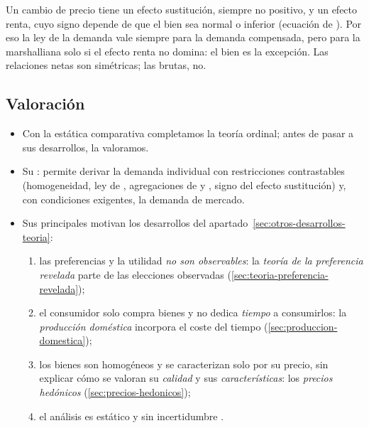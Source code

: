 \documentclass[11pt]{article}
\begin{document}
\begin{ideaclave}
Un cambio de precio tiene un efecto sustitución, siempre no positivo, y un efecto renta, cuyo signo depende de que el bien sea normal o inferior (ecuación de ). Por eso la ley de la demanda vale siempre para la demanda compensada, pero para la marshalliana solo si el efecto renta no domina: el bien  es la excepción. Las relaciones netas son simétricas; las brutas, no.
\end{ideaclave}

\subsection{Valoración}\label{sec:valoracion}

\begin{itemize}
\item Con la estática comparativa completamos la teoría ordinal; antes de pasar a sus desarrollos, la valoramos.
\item Su : permite derivar la demanda individual con restricciones contrastables (homogeneidad, ley de , agregaciones de  y , signo del efecto sustitución) y, con condiciones exigentes, la demanda de mercado.
\item Sus principales  motivan los desarrollos del apartado~\ref{sec:otros-desarrollos-teoria}:
  \begin{enumerate}
  \item las preferencias y la utilidad \emph{no son observables}: la \emph{teoría de la preferencia revelada} parte de las elecciones observadas (\ref{sec:teoria-preferencia-revelada});
  \item el consumidor solo compra bienes y no dedica \emph{tiempo} a consumirlos: la \emph{producción doméstica} incorpora el coste del tiempo (\ref{sec:produccion-domestica});
  \item los bienes son homogéneos y se caracterizan solo por su precio, sin explicar cómo se valoran su \emph{calidad} y sus \emph{características}: los \emph{precios hedónicos} (\ref{sec:precios-hedonicos});
  \item el análisis es estático y sin incertidumbre  .
  \end{enumerate}
\end{itemize}

\end{document}
